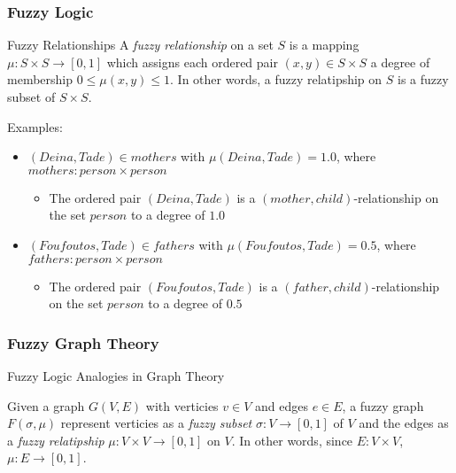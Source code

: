 
\begin{frame}
	\frametitle{Fuzzy Logic}

	\begin{block}{Fuzzy Relationships}
		A \textit{fuzzy relationship} on a set $S$ is a mapping $\mu: S \times S \rightarrow [0, 1]$ which assigns each ordered pair $(x, y) \in S \times S$ a degree of membership $0 \le \mu(x, y) \le 1$. In other words, a fuzzy relatipship on $S$ is a fuzzy subset of $S \times S$.

		\vspace*{2em}

		Examples:
		\begin{itemize}
			\item $(Deina, Tade) \in mothers$ with $\mu(Deina, Tade) = 1.0$, where $mothers: person \times person$
			\begin{itemize}
				\item The ordered pair $(Deina, Tade)$ is a $(mother, child)$-relationship on the set $person$ to a degree of $1.0$
			\end{itemize}
			\item $(Foufoutos, Tade) \in fathers$ with $\mu(Foufoutos, Tade) = 0.5$, where $fathers: person \times person$
			\begin{itemize}
				\item The ordered pair $(Foufoutos, Tade)$ is a $(father, child)$-relationship on the set $person$ to a degree of $0.5$
			\end{itemize}
		\end{itemize}
	\end{block}
\end{frame}

\begin{frame}
	\frametitle{Fuzzy Graph Theory}

	\begin{block}{Fuzzy Logic Analogies in Graph Theory}

		Given a graph $G(V, E)$ with verticies $v \in V$ and edges $e \in E$, a fuzzy graph $F(\sigma, \mu)$ represent verticies as a \textit{fuzzy subset} $\sigma: V \rightarrow [0, 1]$ of $V$ and the edges as a \textit{fuzzy relatipship} $\mu: V \times V \rightarrow [0, 1]$ on $V$. In other words, since $E: V \times V$, $\mu: E \rightarrow [0, 1]$.
	\end{block}
\end{frame}
